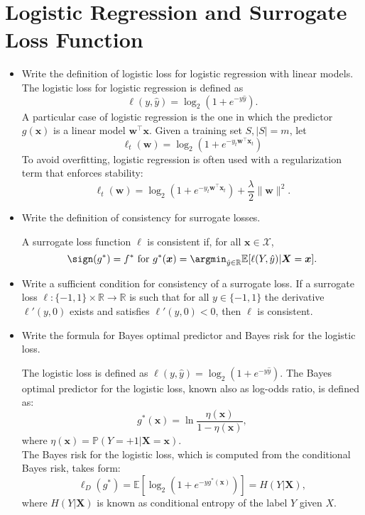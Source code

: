 \newpage
\section{Logistic Regression and Surrogate Loss Function}

\begin{itemize}

    \item Write the definition of logistic loss for logistic regression with linear models.\\

        The logistic loss for logistic regression is defined as
        $$\ell(y, \hat{y}) = \log_2 (1+e^{-y\hat{y}}).$$
        A particular case of logistic regression is the one in which the predictor $g(\boldsymbol{x})$ is a linear model $\boldsymbol{w}^\top \boldsymbol{x}$. Given a training set $S, |S|=m$, let 
        $$\ell_t (\boldsymbol{w}) = \log_2 (1+e^{-y_t \boldsymbol{w}^\top \boldsymbol{x}_t})$$
        To avoid overfitting, logistic regression is often used with a regularization term that enforces stability:
        $$\ell_t (\boldsymbol{w}) = \log_2 (1+e^{-y_t \boldsymbol{w}^\top \boldsymbol{x}_t}) + \frac{\lambda}{2} \|\boldsymbol{w}\|^2.$$

  \item Write the definition of consistency for surrogate losses.

        A surrogate loss function $\ell$ is consistent if, for all $\boldsymbol{x} \in \mathcal{X}$,
        $$\sign (g^*) = f^* \text{ for } g^*(\boldsymbol{x}) = \argmin_{\hat{y} \in \mathbb{R}} \mathbb{E}[\ell(Y,\hat{y})|\boldsymbol{X} = \boldsymbol{x}].$$

  \item Write a sufficient condition for consistency of a surrogate loss.
        If a surrogate loss $\ell:\{-1,1\} \times \mathbb{R} \to \mathbb{R}$ is such that for all $y \in \{-1,1\}$ the derivative $\ell'(y,0)$ exists and satisfies $\ell'(y,0) < 0$, then $\ell$ is consistent.

  \item Write the formula for Bayes optimal predictor and Bayes risk for the logistic loss.

        The logistic loss is defined as $\ell(y, \hat{y}) = \log_2 (1 + e^{-y\hat{y}})$. The Bayes optimal predictor for the logistic loss, known also as log-odds ratio, is defined as:
        $$g^*(\boldsymbol{x}) = \ln \frac{\eta(\boldsymbol{x})}{1-\eta(\boldsymbol{x})},$$
        where $\eta(\boldsymbol{x}) = \mathbb{P} (Y=+1|\boldsymbol{X} = \boldsymbol{x})$.\\
        The Bayes risk for the logistic loss, which is computed from the conditional Bayes risk, takes form:
        $$\ell_D (g^*) = \mathbb{E}[\log_2(1+e^{-yg^*(\boldsymbol{x})})] = H(Y|\boldsymbol{X}),$$
        where $H(Y|\boldsymbol{X})$ is known as conditional entropy of the label $Y$ given $X$.

\end{itemize}
